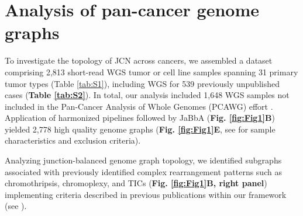 \documentclass[phd,tocprelim]{cornell}
\renewcommand{\caption}[1]{\singlespacing\hangcaption{#1}\normalspacing}
\begin{document}
\section{Analysis of pan-cancer genome graphs}
To investigate the topology of JCN across cancers, we assembled a dataset comprising 2,813 short-read WGS tumor or cell line samples spanning 31 primary tumor types (Table \ref{tab:S1}), including WGS for 539 previously unpublished cases  (\textbf{Table \ref{tab:S2}}). In total, our analysis included 1,648 WGS samples not included in the Pan-Cancer Analysis of Whole Genomes (PCAWG) effort \cite{pcawg_marker2020-yi}.  Application of harmonized pipelines followed by JaBbA (\textbf{Fig. \ref{fig:Fig1}B}) yielded 2,778 high quality genome graphs (\textbf{Fig. \ref{fig:Fig1}E}, see  for sample characteristics and exclusion criteria). 



Analyzing junction-balanced genome graph topology, we identified subgraphs associated with previously identified complex rearrangement patterns such as chromothripsis, chromoplexy, and TICs (\textbf{Fig. \ref{fig:Fig1}B, right panel}) implementing criteria described in previous publications within our framework (see ). 

\end{document}
